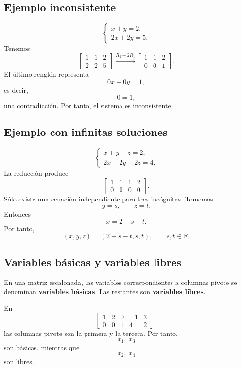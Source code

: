 \documentclass[12pt]{article}
\theoremstyle{remark}
\newcommand{\R}{\mathbb{R}}
\begin{document}
\subsection*{Ejemplo inconsistente}
\[
\begin{cases}
x+y=2,\\
2x+2y=5.
\end{cases}
\]
Tenemos
\[
\left[
\begin{array}{cc|c}
1&1&2\\
2&2&5
\end{array}
\right]
\xrightarrow{R_2-2R_1}
\left[
\begin{array}{cc|c}
1&1&2\\
0&0&1
\end{array}
\right].
\]
El último renglón representa
\[
0x+0y=1,
\]
es decir,
\[
0=1,
\]
una contradicción. Por tanto, el sistema es inconsistente.
\subsection*{Ejemplo con infinitas soluciones}
\[
\begin{cases}
x+y+z=2,\\
2x+2y+2z=4.
\end{cases}
\]
La reducción produce
\[
\left[
\begin{array}{ccc|c}
1&1&1&2\\
0&0&0&0
\end{array}
\right].
\]
Sólo existe una ecuación independiente para tres incógnitas. Tomemos
\[
y=s,\qquad z=t.
\]
Entonces
\[
x=2-s-t.
\]
Por tanto,
\[
\boxed{(x,y,z)=(2-s-t,s,t),\qquad s,t\in\R.}
\]
\subsection*{Variables básicas y variables libres}
En una matriz escalonada, las variables correspondientes a columnas pivote se denominan \textbf{variables básicas}. Las restantes son \textbf{variables libres}.

En
\[
\left[
\begin{array}{cccc|c}
1&2&0&-1&3\\
0&0&1&4&2
\end{array}
\right],
\]
las columnas pivote son la primera y la tercera. Por tanto,
\[
x_1,\ x_3
\]
son básicas, mientras que
\[
x_2,\ x_4
\]
son libres.
\end{document}
